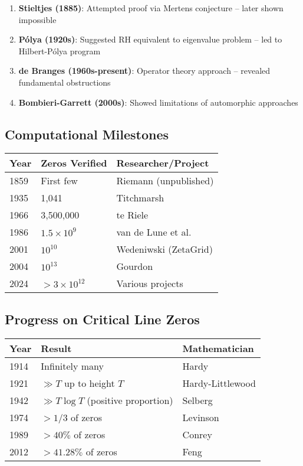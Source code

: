 \begin{enumerate}
\item \textbf{Stieltjes (1885)}: Attempted proof via Mertens conjecture -- later shown impossible
\item \textbf{P\'olya (1920s)}: Suggested RH equivalent to eigenvalue problem -- led to Hilbert-P\'olya program
\item \textbf{de Branges (1960s-present)}: Operator theory approach -- revealed fundamental obstructions
\item \textbf{Bombieri-Garrett (2000s)}: Showed limitations of automorphic approaches
\end{enumerate}

\subsection*{Computational Milestones}

\begin{center}
\begin{tabular}{|l|l|l|}
\hline
\textbf{Year} & \textbf{Zeros Verified} & \textbf{Researcher/Project} \\
\hline
1859 & First few & Riemann (unpublished) \\
1935 & 1,041 & Titchmarsh \\
1966 & 3,500,000 & te Riele \\
1986 & $1.5 \times 10^9$ & van de Lune et al. \\
2001 & $10^{10}$ & Wedeniwski (ZetaGrid) \\
2004 & $10^{13}$ & Gourdon \\
2024 & $> 3 \times 10^{12}$ & Various projects \\
\hline
\end{tabular}
\end{center}

\subsection*{Progress on Critical Line Zeros}

\begin{center}
\begin{tabular}{|l|l|l|}
\hline
\textbf{Year} & \textbf{Result} & \textbf{Mathematician} \\
\hline
1914 & Infinitely many & Hardy \\
1921 & $\gg T$ up to height $T$ & Hardy-Littlewood \\
1942 & $\gg T \log T$ (positive proportion) & Selberg \\
1974 & $> 1/3$ of zeros & Levinson \\
1989 & $> 40\%$ of zeros & Conrey \\
2012 & $> 41.28\%$ of zeros & Feng \\
\hline
\end{tabular}
\end{center}

